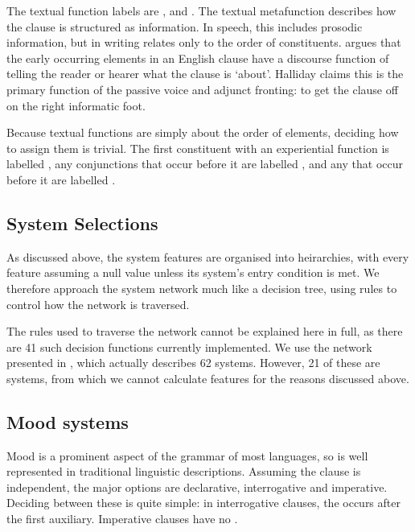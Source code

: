\documentclass[11pt]{article}
\begin{document}
The textual function labels are ,  and . The textual metafunction describes how the clause is structured as information. In speech, this includes prosodic information, but in writing relates only to the order of constituents. \citet{halliday_options} argues that the early occurring elements in an English clause have a discourse function of telling the reader or hearer what the clause is `about'. Halliday claims this is the primary function of the passive voice and adjunct fronting: to get the clause off on the right informatic foot.

Because textual functions are simply about the order of elements, deciding how to assign them is trivial. The first constituent with an experiential function is labelled , any conjunctions that occur before it are labelled , and any  that occur before it are labelled .

\subsection{System Selections}

As discussed above, the system features are organised into heirarchies, with every feature assuming a null value unless its system's entry condition is met. We therefore approach the system network much like a decision tree, using rules to control how the network is traversed.

The rules used to traverse the network cannot be explained here in full, as there are 41 such decision functions currently implemented. We use the network presented in \citet{lexcart}, which actually describes 62 systems. However, 21 of these are  systems, from which we cannot calculate features for the reasons discussed above. 

\subsection{Mood systems}

Mood is a prominent aspect of the grammar of most languages, so is well represented in traditional linguistic descriptions. Assuming the clause is independent, the major options are declarative, interrogative and imperative. Deciding between these is quite simple: in interrogative clauses, the  occurs after the first auxiliary. Imperative clauses have no .
\end{document}
